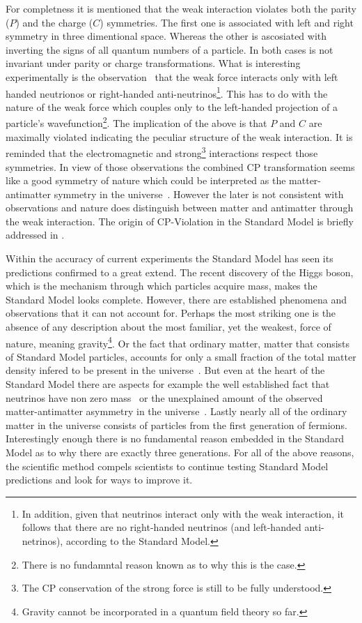 For completness it is mentioned that the weak interaction violates both the parity ($P$) and the charge ($C$) symmetries.
The first one is associated with left and right symmetry in three dimentional space. Whereas the other is ascosiated with inverting the signs of all quantum numbers of a particle.
In both cases  is not invariant under parity or charge transformations. What is interesting experimentally
is the observation~\cite{wu-parity,garwin-parity} that the weak force interacts only with left handed neutrionos or right-handed
anti-neutrinos\footnote{In addition, given that neutrinos interact only with the weak interaction, it follows that there are no
right-handed neutrinos (and left-handed anti-netrinos), according to the Standard Model.}. This has to do with the nature of
the weak force which couples only to the left-handed projection of a particle's
wavefunction\footnote{There is no fundamntal reason known as to why this is the case.}. The implication of the above is that
$P$ and $C$ are maximally violated indicating the peculiar structure of the weak interaction. It is reminded that
the electromagnetic and strong\footnote{The CP conservation of the strong force is still to be fully understood.} interactions respect those symmetries. In view of those observations the combined CP transformation
seems like a good symmetry of nature which could be interpreted as the matter-antimatter symmetry in the universe~\cite{Sakharov:1967dj}.
However the later is not consistent with observations and nature does distinguish between matter and antimatter through
the weak interaction. The origin of CP-Violation in the Standard Model is briefly addressed in .

Within the accuracy of current experiments the Standard Model has seen its predictions confirmed to a great extend.
The recent discovery of the Higgs boson, which is the mechanism through which particles acquire mass, makes the Standard Model looks
complete. However, there are established phenomena and observations that it can not
account for. Perhaps the most striking one is the absence of any description about the most familiar, yet the weakest, force of nature,
meaning gravity\footnote{Gravity cannot be incorporated in a quantum field theory so far.}.
Or the fact that ordinary matter, \ie matter that consists of Standard Model particles, accounts for only a small
fraction of the total matter density infered to be present in the universe~\cite{dmatter-Hinshaw}. But even at the heart
of the Standard Model there are aspects for example the well established fact that neutrinos have non zero
mass~\cite{nu-mass-superkam,nu-mass-kamland,nu-mass-sno,nu-mass-daya} or the unexplained amount of the observed
matter-antimatter asymmetry in the universe~\cite{more-cpv-huet,more-cpv-gavela_I,more-cpv-gavela_II}.
Lastly nearly all of the ordinary matter in the universe consists of
particles from the first generation of fermions. Interestingly enough there is no fundamental reason embedded in the Standard Model
as to why there are exactly three generations. For all of the above reasons, the scientific method compels scientists to continue
testing Standard Model predictions and look for ways to improve it.
